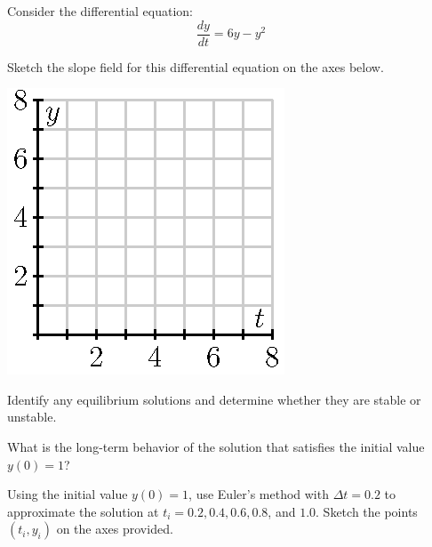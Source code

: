 \begin{activity} \label{A:7.3.1}  
Consider the differential equation:
$$
  \frac{dy}{dt} = 6y-y^2
$$
\ba
\item Sketch the slope field for this differential equation on the axes below.

\begin{center}
  \includegraphics{figures/7_3_slopefield.eps}
\end{center}

\item Identify any equilibrium solutions and determine whether they
  are stable or unstable.   

\item What is the long-term behavior of the solution that satisfies the initial
  value $y(0) = 1$?

\item Using the initial value $y(0) = 1$, use Euler's method with
  $\Delta t = 0.2$ to approximate the solution at $t_i = 0.2, 0.4,
  0.6, 0.8$, and $1.0$.  Sketch the points $(t_i, y_i)$ on the axes provided.


\end{activity}
